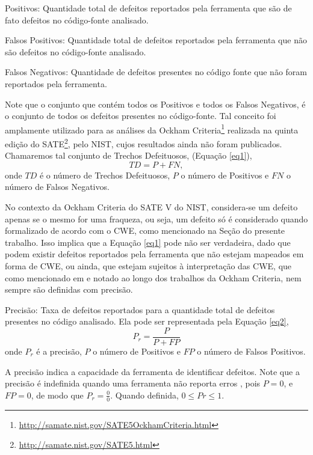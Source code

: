 Positivos: Quantidade total de defeitos reportados pela ferramenta que são de fato defeitos no código-fonte analisado.

Falsos Positivos: Quantidade total de defeitos reportados pela ferramenta que não são defeitos no código-fonte analisado.

Falsos Negativos: Quantidade de defeitos presentes no código fonte que não foram reportados pela ferramenta.

Note que o conjunto que contém todos os Positivos e todos os Falsos Negativos, é o conjunto de todos os defeitos presentes no código-fonte. Tal conceito foi amplamente utilizado para as análises da Ockham Criteria\footnote{\url{http://samate.nist.gov/SATE5OckhamCriteria.html}} realizada na quinta edição do SATE\footnote{\url{http://samate.nist.gov/SATE5.html}}, pelo NIST, cujos resultados ainda não foram publicados. Chamaremos tal conjunto de Trechos Defeituosos, (Equação \eqref{eq1}),
\begin{equation}\label{eq1}
TD = P + FN,
\end{equation}
  onde $TD$ é o número de Trechos Defeituosos, $P$ o número de Positivos e $FN$ o número de Falsos Negativos.

  No contexto da Ockham Criteria do SATE V do NIST, considera-se um defeito apenas se o mesmo for uma fraqueza, ou seja, um defeito só é considerado quando formalizado de acordo com o CWE, como mencionado   na Seção  do presente trabalho. Isso implica que a Equação \eqref{eq1} pode não ser verdadeira, dado que podem existir defeitos reportados pela ferramenta que não estejam mapeados em forma de CWE, ou ainda, que estejam sujeitos à interpretação das CWE, que como mencionado em \cite{yan} e notado ao longo dos trabalhos  da Ockham Criteria, nem sempre são definidas com precisão.

  Precisão: Taxa de defeitos reportados para a quantidade total de defeitos presentes no código analisado.  Ela pode ser representada pela Equação \eqref{eq2},
\begin{equation}\label{eq2}
  P_r = \frac{P}{P + FP}
\end{equation}
  onde $P_r$ é a precisão, $P$ o número de Positivos e $FP$ o número de Falsos Positivos.

  A precisão indica a capacidade da ferramenta de identificar defeitos. Note que a precisão é indefinida quando uma ferramenta não reporta erros \cite{nsa}, pois $P = 0$, e $FP = 0$, de modo que $P_r = \frac{0}{0}$. Quando definida, $0 \leq Pr \leq 1$.

